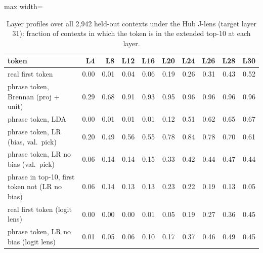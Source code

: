 \begin{table}[t]
\centering
\footnotesize
\caption{Layer profiles over all 2,942 held-out contexts under the Hub J-lens (target layer 31): fraction of contexts in which the token is in the extended top-10 at each layer.}
\label{tab:bench_profiles}
\begin{adjustbox}{max width=\textwidth}
\begin{tabular}{lrrrrrrrrr}
\toprule
token & L4 & L8 & L12 & L16 & L20 & L24 & L26 & L28 & L30 \\
\midrule
real first token & 0.00 & 0.01 & 0.04 & 0.06 & 0.19 & 0.26 & 0.31 & 0.43 & 0.52 \\
phrase token, Brennan (proj + unit) & 0.29 & 0.68 & 0.91 & 0.93 & 0.95 & 0.96 & 0.96 & 0.96 & 0.96 \\
phrase token, LDA & 0.00 & 0.01 & 0.01 & 0.01 & 0.12 & 0.51 & 0.62 & 0.65 & 0.67 \\
phrase token, LR (bias, val.\ pick) & 0.20 & 0.49 & 0.56 & 0.55 & 0.78 & 0.84 & 0.78 & 0.70 & 0.61 \\
phrase token, LR no bias (val.\ pick) & 0.06 & 0.14 & 0.14 & 0.15 & 0.33 & 0.42 & 0.44 & 0.47 & 0.44 \\
phrase in top-10, first token not (LR no bias) & 0.06 & 0.14 & 0.13 & 0.13 & 0.23 & 0.22 & 0.19 & 0.13 & 0.05 \\
\midrule
real first token (logit lens) & 0.00 & 0.00 & 0.00 & 0.01 & 0.05 & 0.19 & 0.27 & 0.36 & 0.45 \\
phrase token, LR no bias (logit lens) & 0.01 & 0.05 & 0.06 & 0.10 & 0.17 & 0.37 & 0.46 & 0.49 & 0.45 \\
\bottomrule
\end{tabular}
\end{adjustbox}
\end{table}